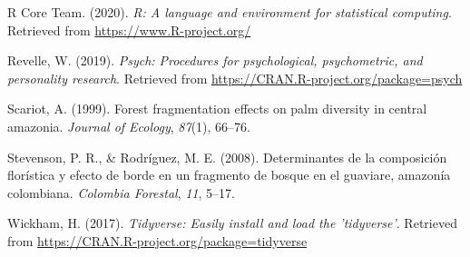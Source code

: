 \documentclass[11pt,]{article}
\begin{document}
\hypertarget{ref-RSoft}{}
R Core Team. (2020). \emph{R: A language and environment for statistical
computing}. Retrieved from \url{https://www.R-project.org/}

\hypertarget{ref-psych}{}
Revelle, W. (2019). \emph{Psych: Procedures for psychological,
psychometric, and personality research}. Retrieved from
\url{https://CRAN.R-project.org/package=psych}

\hypertarget{ref-scariot1999forest}{}
Scariot, A. (1999). Forest fragmentation effects on palm diversity in
central amazonia. \emph{Journal of Ecology}, \emph{87}(1), 66--76.

\hypertarget{ref-stevenson2008determinantes}{}
Stevenson, P. R., \& Rodríguez, M. E. (2008). Determinantes de la
composición florística y efecto de borde en un fragmento de bosque en el
guaviare, amazonía colombiana. \emph{Colombia Forestal}, \emph{11},
5--17.

\hypertarget{ref-Tidyverse}{}
Wickham, H. (2017). \emph{Tidyverse: Easily install and load the
'tidyverse'}. Retrieved from
\url{https://CRAN.R-project.org/package=tidyverse}




\newpage
\singlespacing 
\end{document}
